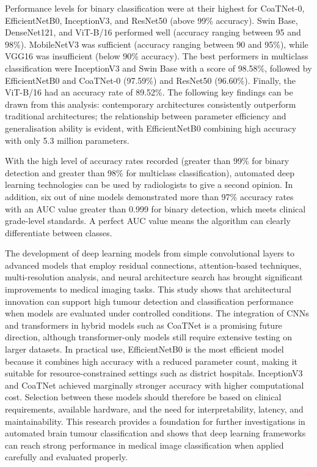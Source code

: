 \documentclass[final,3p,times,number]{elsarticle}
\begin{document}
Performance levels for binary classification were at their highest for CoaTNet-0, EfficientNetB0, InceptionV3, and ResNet50 (above 99\% accuracy). Swin Base, DenseNet121, and ViT-B/16 performed well (accuracy ranging between 95 and 98\%). MobileNetV3 was sufficient (accuracy ranging between 90 and 95\%), while VGG16 was insufficient (below 90\% accuracy). The best performers in multiclass classification were InceptionV3 and Swin Base with a score of 98.58\%, followed by EfficientNetB0 and CoaTNet-0 (97.59\%) and ResNet50 (96.60\%). Finally, the ViT-B/16 had an accuracy rate of 89.52\%. The following key findings can be drawn from this analysis: contemporary architectures consistently outperform traditional architectures; the relationship between parameter efficiency and generalisation ability is evident, with EfficientNetB0 combining high accuracy with only 5.3 million parameters.

With the high level of accuracy rates recorded (greater than 99\% for binary detection and greater than 98\% for multiclass classification), automated deep learning technologies can be used by radiologists to give a second opinion. In addition, six out of nine models demonstrated more than 97\% accuracy rates with an AUC value greater than 0.999 for binary detection, which meets clinical grade-level standards. A perfect AUC value means the algorithm can clearly differentiate between classes.

The development of deep learning models from simple convolutional layers to advanced models that employ residual connections, attention-based techniques, multi-resolution analysis, and neural architecture search has brought significant improvements to medical imaging tasks. This study shows that architectural innovation can support high tumour detection and classification performance when models are evaluated under controlled conditions. The integration of CNNs and transformers in hybrid models such as CoaTNet is a promising future direction, although transformer-only models still require extensive testing on larger datasets. In practical use, EfficientNetB0 is the most efficient model because it combines high accuracy with a reduced parameter count, making it suitable for resource-constrained settings such as district hospitals. InceptionV3 and CoaTNet achieved marginally stronger accuracy with higher computational cost. Selection between these models should therefore be based on clinical requirements, available hardware, and the need for interpretability, latency, and maintainability. This research provides a foundation for further investigations in automated brain tumour classification and shows that deep learning frameworks can reach strong performance in medical image classification when applied carefully and evaluated properly.
\end{document}
